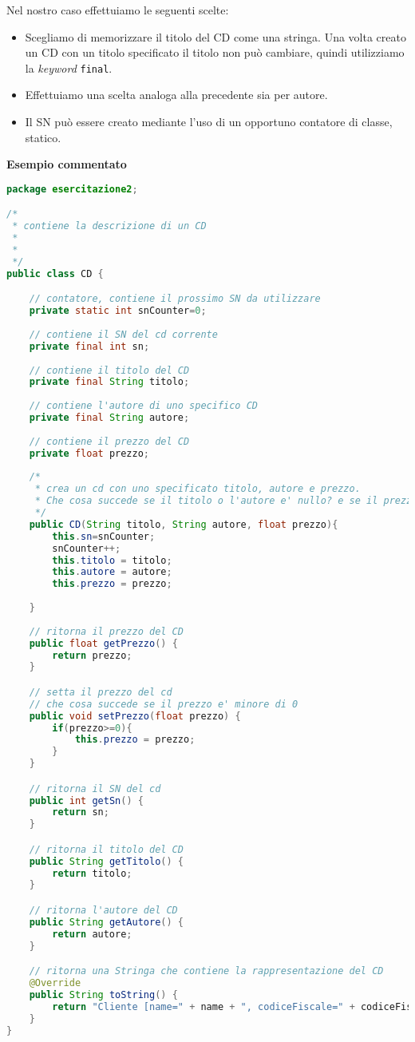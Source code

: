 \documentclass{article}
\begin{document}
Nel nostro caso effettuiamo le seguenti scelte:
\begin{itemize}
\item Scegliamo di memorizzare il titolo del CD come una stringa. Una volta creato un CD con un titolo specificato il titolo non pu\`o cambiare, quindi utilizziamo la \textit{keyword} \texttt{final}.
\item Effettuiamo una scelta analoga alla precedente sia per autore.
\item Il SN pu\`o essere creato mediante l'uso di un opportuno contatore di classe, statico. 
\end{itemize}

\textbf{Esempio commentato}
\begin{lstlisting}[language=Java,escapechar=|]
package esercitazione2;

/*
 * contiene la descrizione di un CD
 * 
 *
 */
public class CD {

	// contatore, contiene il prossimo SN da utilizzare
	private static int snCounter=0;
	
	// contiene il SN del cd corrente
	private final int sn;
	
	// contiene il titolo del CD
	private final String titolo;
	
	// contiene l'autore di uno specifico CD
	private final String autore;
	
	// contiene il prezzo del CD
	private float prezzo;
	
	/*
	 * crea un cd con uno specificato titolo, autore e prezzo.
	 * Che cosa succede se il titolo o l'autore e' nullo? e se il prezzo e' minore di 0?
	 */
	public CD(String titolo, String autore, float prezzo){
		this.sn=snCounter;
		snCounter++;
		this.titolo = titolo;
		this.autore = autore;
		this.prezzo = prezzo;
		
	}
	
	// ritorna il prezzo del CD
	public float getPrezzo() {
		return prezzo;
	}

	// setta il prezzo del cd
	// che cosa succede se il prezzo e' minore di 0
	public void setPrezzo(float prezzo) {
	    if(prezzo>=0){
			this.prezzo = prezzo;
	    }
	}

	// ritorna il SN del cd
	public int getSn() {
		return sn;
	}

	// ritorna il titolo del CD
	public String getTitolo() {
		return titolo;
	}

	// ritorna l'autore del CD
	public String getAutore() {
		return autore;
	}

	// ritorna una Stringa che contiene la rappresentazione del CD 
	@Override
	public String toString() {
		return "Cliente [name=" + name + ", codiceFiscale=" + codiceFiscale+ "]";
	}
}
\end{lstlisting}
\end{document}
